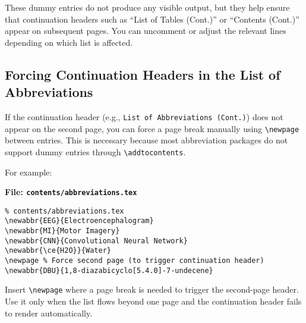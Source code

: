 \begin{subparagraph}
These dummy entries do not produce any visible output, but they help ensure that continuation headers such as “List of Tables (Cont.)” or “Contents (Cont.)” appear on subsequent pages. You can uncomment or adjust the relevant lines depending on which list is affected.
\end{subparagraph}

\subsection{Forcing Continuation Headers in the List of Abbreviations}

\begin{subparagraph}
If the continuation header (e.g., \texttt{List of Abbreviations (Cont.)}) does not appear on the second page, you can force a page break manually using \verb|\newpage| between entries. This is necessary because most abbreviation packages do not support dummy entries through \verb|\addtocontents|.
\end{subparagraph}

\begin{subparagraph}
For example:
\end{subparagraph}

\noindent\textbf{File: \texttt{contents/abbreviations.tex}}\vspace{-1em}
\begin{verbatim}
% contents/abbreviations.tex
\newabbr{EEG}{Electroencephalogram}
\newabbr{MI}{Motor Imagery}
\newabbr{CNN}{Convolutional Neural Network}
\newabbr{\ce{H2O}}{Water} 
\newpage % Force second page (to trigger continuation header)
\newabbr{DBU}{1,8-diazabicyclo[5.4.0]-7-undecene}
\end{verbatim}

\newpage
\begin{subparagraph}
Insert \verb|\newpage| where a page break is needed to trigger the second-page header. Use it only when the list flows beyond one page and the continuation header fails to render automatically.
\end{subparagraph}

